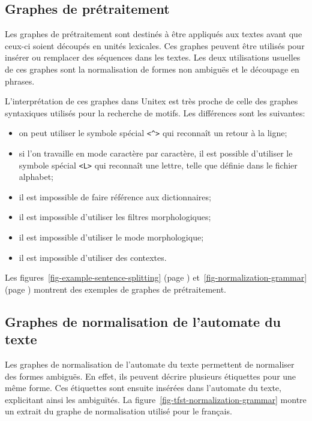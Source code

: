 \subsection{Graphes de prétraitement}
Les graphes de prétraitement sont destinés à être appliqués aux textes avant que ceux-ci soient
découpés en unités lexicales. Ces graphes peuvent être utilisés pour insérer ou
remplacer des séquences dans les textes. Les deux utilisations usuelles de ces graphes sont
la normalisation de formes non ambiguës et le découpage en phrases.


\bigskip
\noindent L’interprétation de ces graphes dans Unitex est très proche de celle des graphes
syntaxiques utilisés pour la recherche de motifs. Les différences sont les suivantes:

\begin{itemize}
  \item on peut utiliser le symbole spécial \verb+<^>+ qui reconnaît un retour à la
  	  ligne;\index{\verb+<^>+}
  \item si l'on travaille en mode caractère par caractère, il est possible d'utiliser 
  	  le symbole spécial \verb+<L>+ qui reconnaît une lettre, telle que définie dans le fichier
  	  alphabet;
  \item il est impossible de faire référence aux dictionnaires;
  \item il est impossible d’utiliser les filtres morphologiques;
  \item il est impossible d’utiliser le mode morphologique;
  \item il est impossible d’utiliser des contextes.
\end{itemize}

Les figures~\ref{fig-example-sentence-splitting} (page \pageref{fig-example-sentence-splitting})
et~\ref{fig-normalization-grammar} (page \pageref{fig-normalization-grammar}) montrent des exemples
de graphes de prétraitement.


\subsection{Graphes de normalisation de l’automate du texte}
\label{section-normalizing-text-automataon}
Les graphes de normalisation de l’automate du texte permettent de normaliser des formes
ambiguës. En effet, ils peuvent décrire plusieurs étiquettes pour une même forme. Ces étiquettes
sont ensuite insérées dans l’automate du texte, explicitant ainsi les ambiguïtés. La
figure~\ref{fig-tfst-normalization-grammar} montre un extrait du graphe de normalisation utilisé
pour le français.

